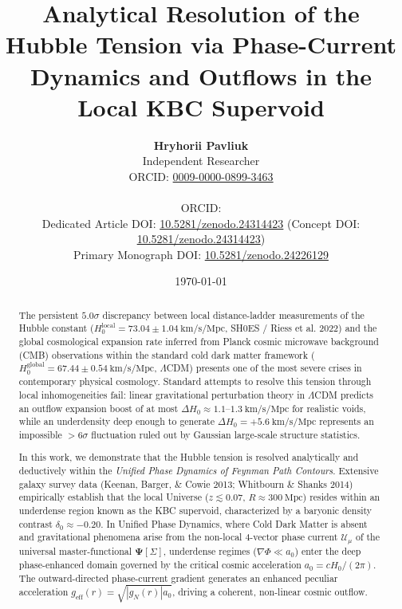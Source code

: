 \documentclass[11pt,a4paper]{article}
\title{\textbf{Analytical Resolution of the Hubble Tension via Phase-Current Dynamics and Outflows in the Local KBC Supervoid}}
\author{\textbf{Hryhorii Pavliuk}\\[0.3em]
\small Independent Researcher\\[0.2em]
\small ORCID: \href{https://orcid.org/0009-0000-0899-3463}{0009-0000-0899-3463}\\[0.2em]\\
\small ORCID: \texttt{}\\[0.2em]
\small Dedicated Article DOI: \href{https://doi.org/10.5281/zenodo.24314423}{10.5281/zenodo.24314423} \quad (Concept DOI: \href{https://doi.org/10.5281/zenodo.24314423}{10.5281/zenodo.24314423})\\[0.2em]
\small Primary Monograph DOI: \href{https://doi.org/10.5281/zenodo.24226129}{10.5281/zenodo.24226129}}
\date{\today}
\begin{document}
\maketitle

\begin{abstract}
The persistent $5.0\sigma$ discrepancy between local distance-ladder measurements of the Hubble constant ($H_0^{\mathrm{local}} = 73.04 \pm 1.04\ \mathrm{km/s/Mpc}$, SH0ES / Riess et al. 2022) and the global cosmological expansion rate inferred from Planck cosmic microwave background (CMB) observations within the standard cold dark matter framework ($H_0^{\mathrm{global}} = 67.44 \pm 0.54\ \mathrm{km/s/Mpc}$, $\Lambda$CDM) presents one of the most severe crises in contemporary physical cosmology. Standard attempts to resolve this tension through local inhomogeneities fail: linear gravitational perturbation theory in $\Lambda$CDM predicts an outflow expansion boost of at most $\Delta H_0 \approx 1.1\text{--}1.3\ \mathrm{km/s/Mpc}$ for realistic voids, while an underdensity deep enough to generate $\Delta H_0 = +5.6\ \mathrm{km/s/Mpc}$ represents an impossible $> 6\sigma$ fluctuation ruled out by Gaussian large-scale structure statistics.

In this work, we demonstrate that the Hubble tension is resolved analytically and deductively within the \textit{Unified Phase Dynamics of Feynman Path Contours}. Extensive galaxy survey data (Keenan, Barger, \& Cowie 2013; Whitbourn \& Shanks 2014) empirically establish that the local Universe ($z \lesssim 0.07$, $R \approx 300\ \mathrm{Mpc}$) resides within an underdense region known as the KBC supervoid, characterized by a baryonic density contrast $\delta_0 \approx -0.20$. In Unified Phase Dynamics, where Cold Dark Matter is absent and gravitational phenomena arise from the non-local 4-vector phase current $\mathcal{U}_\mu$ of the universal master-functional $\mathbf{\Psi}[\Sigma]$, underdense regimes ($\nabla \Phi \ll a_0$) enter the deep phase-enhanced domain governed by the critical cosmic acceleration $a_0 = c H_0 / (2\pi)$. The outward-directed phase-current gradient generates an enhanced peculiar acceleration $g_{\mathrm{eff}}(r) = \sqrt{|g_N(r)| a_0}$, driving a coherent, non-linear cosmic outflow.


\end{abstract}
\end{document}
